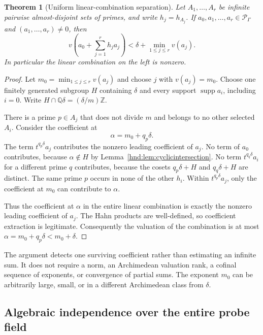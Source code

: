 \documentclass[11pt,oneside]{article}
\newtheorem{theorem}{Theorem}[section]
\theoremstyle{definition}
\theoremstyle{remark}
\newcommand{\Q}{\mathbb Q}
\newcommand{\Z}{\mathbb Z}
\newcommand{\Pfield}{\mathscr P_\Gamma}
\newcommand{\supp}{\operatorname{supp}}
\begin{document}
\begin{theorem}[Uniform linear-combination separation]\label{hnd:thm:separation}
Let $A_1,\ldots,A_r$ be infinite pairwise almost-disjoint sets of primes,
and write $h_j=h_{A_j}$. If $a_0,a_1,\ldots,a_r\in\Pfield$ and
$(a_1,\ldots,a_r)\ne0$, then
\begin{equation}\label{hnd:eq:separation}
 v\!\left(a_0+\sum_{j=1}^r h_j a_j\right)
 <\delta+\min_{1\le j\le r}v(a_j).
\end{equation}
In particular the linear combination on the left is nonzero.
\end{theorem}
\begin{proof}
Let $m_0=\min_{1\le j\le r}v(a_j)$ and choose $j$ with
$v(a_j)=m_0$. Choose one finitely generated subgroup $H$ containing
$\delta$ and every support $\supp a_i$, including $i=0$.
Write $H\cap\Q\delta=(\delta/m)\Z$.

There is a prime $p\in A_j$ that does not divide $m$ and belongs to no
other selected $A_i$. Consider the coefficient at
\[
 \alpha=m_0+q_p\delta.
\]
The term $t^{q_p\delta}a_j$ contributes the nonzero leading coefficient
of $a_j$. No term of $a_0$ contributes, because
$\alpha\notin H$ by Lemma~\ref{hnd:lem:cyclicintersection}.
No term $t^{q_q\delta}a_i$ for a different prime $q$ contributes,
because the cosets $q_p\delta+H$ and $q_q\delta+H$ are distinct.
The same prime $p$ occurs in none of the other $h_i$.
Within $t^{q_p\delta}a_j$, only the coefficient at $m_0$ can contribute
to $\alpha$.

Thus the coefficient at $\alpha$ in the entire linear combination is
exactly the nonzero leading coefficient of $a_j$. The Hahn products are
well-defined, so coefficient extraction is legitimate. Consequently the
valuation of the combination is at most
$\alpha=m_0+q_p\delta<m_0+\delta$.
\end{proof}

The argument detects one surviving coefficient rather than estimating
an infinite sum. It does not require a norm, an Archimedean valuation
rank, a cofinal sequence of exponents, or convergence of partial sums.
The exponent $m_0$ can be arbitrarily large, small, or in a different
Archimedean class from $\delta$.

\subsection{Algebraic independence over the entire probe field}
\end{document}

